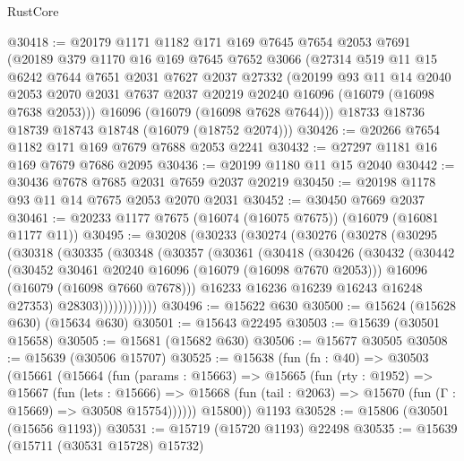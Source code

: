 \begin{lexlean}{RustCore}
\begin{coremodule}
@30418 := @20179
    @1171
    @1182
    @171
    @169
    @7645
    @7654
    @2053
    @7691
    (@20189
      @379
      @1170
      @16
      @169
      @7645
      @7652
      @3066
      (@27314
        @519
        @11
        @15
        @6242
        @7644
        @7651
        @2031
        @7627
        @2037
        @27332
        (@20199
          @93
          @11
          @14
          @2040
          @2053
          @2070
          @2031
          @7637
          @2037
          @20219
          @20240
          @16096
          (@16079 (@16098 @7638 @2053)))
        @16096
        (@16079 (@16098 @7628 @7644)))
      @18733
      @18736
      @18739
      @18743
      @18748
      (@16079 (@18752 @2074)))
@30426 := @20266 @7654 @1182 @171 @169 @7679 @7688 @2053 @2241
@30432 := @27297 @1181 @16 @169 @7679 @7686 @2095
@30436 := @20199 @1180 @11 @15 @2040
@30442 := @30436 @7678 @7685 @2031 @7659 @2037 @20219
@30450 := @20198 @1178 @93 @11 @14 @7675 @2053 @2070 @2031
@30452 := @30450 @7669 @2037
@30461 := @20233 @1177 @7675 (@16074 (@16075 @7675)) (@16079 (@16081 @1177 @11))
@30495 := @30208
    (@30233
      (@30274
        (@30276
          (@30278
            (@30295
              (@30318
                (@30335
                  (@30348
                    (@30357
                      (@30361
                        (@30418
                          (@30426
                            (@30432
                              (@30442
                                (@30452 @30461 @20240 @16096 (@16079 (@16098 @7670 @2053)))
                                @16096
                                (@16079 (@16098 @7660 @7678)))
                              @16233
                              @16236
                              @16239
                              @16243
                              @16248
                              @27353)
                            @28303))))))))))))
@30496 := @15622 @630
@30500 := @15624 (@15628 @630) (@15634 @630)
@30501 := @15643 @22495
@30503 := @15639 (@30501 @15658)
@30505 := @15681 (@15682 @630)
@30506 := @15677 @30505
@30508 := @15639 (@30506 @15707)
@30525 := @15638
    (fun (fn : @40) =>
    @30503
      (@15661
        (@15664
          (fun (params : @15663) =>
          @15665
            (fun (rty : @1952) =>
            @15667
              (fun (lets : @15666) =>
              @15668 (fun (tail : @2063) => @15670 (fun (Γ : @15669) => @30508 @15754))))))
        @15800))
    @1193
@30528 := @15806 (@30501 (@15656 @1193))
@30531 := @15719 (@15720 @1193) @22498
@30535 := @15639 (@15711 (@30531 @15728) @15732)

\end{coremodule}
\end{lexlean}
